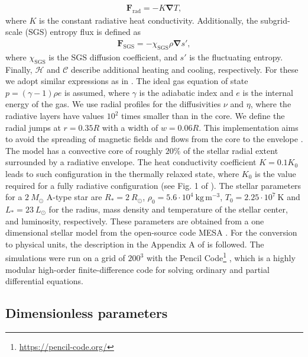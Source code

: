 \documentclass[baaa]{baaa}
\begin{document}
\begin{align}
    \bm{F}_\mathrm{rad} = - K \bm{\nabla} T, \label{radiative-flux}
\end{align}
where $K$ is the constant radiative heat conductivity. Additionally, the subgrid-scale (SGS) entropy flux is defined as
\begin{align}
    \bm{F}_\mathrm{SGS} = -\chi_\mathrm{SGS} \rho \bm{\nabla}s', \label{entropy-flux}
\end{align}
where $\chi_\mathrm{SGS}$ is the SGS diffusion coefficient, and $s'$ is the fluctuating entropy. Finally, $\mathcal{H}$ and $\mathcal{C}$ describe additional heating and cooling, respectively. For these we adopt similar expressions as in \cite{Kapyla-2021}. The ideal gas equation of state $p = (\gamma - 1)\rho e$ is assumed, where $\gamma$ is the adiabatic index and $e$ is the internal energy of the gas. We use radial profiles for the diffusivities $\nu$ and $\eta$, where the radiative layers have values $10^2$ times smaller than in the core. We define the radial jumps at $r=0.35R$ with a width of $w = 0.06R$. This implementation aims to avoid the spreading of magnetic fields and flows from the core to the envelope \citep[see][]{Kapyla-2022}.\\

The model has a convective core of roughly $20\%$ of the stellar radial extent surrounded by a radiative envelope. The heat conductivity coefficient $K = 0.1K_0$ leads to such configuration in the thermally relaxed state, where $K_0$ is the value required for a fully radiative configuration (see Fig. 1 of \citealt{Hidalgo-2023}). The stellar parameters for a $2~M_\odot$ A-type star are $R_* = 2 ~ R_\odot$, $\rho_0 = 5.6 \cdot 10^4~\mathrm{kg}\,\mathrm{m^{-3}}$, $T_0 = 2.25 \cdot 10^{7}~\mathrm{K}$ and $L_* = 23~ L_\odot$ for the radius, mass density and temperature of the stellar center, and luminosity, respectively. These parameters are obtained from a one dimensional stellar model from the open-source code MESA \citep{Paxton-2019}. For the conversion to physical units, the description in the Appendix A of \cite{Kapyla-2020} is followed. The simulations were run on a grid of $200^3$ with the {\sc Pencil Code}\footnote{\url{https://pencil-code.org/}} \citep{Pencil-code-2021}, which is a highly modular high-order finite-difference code for solving ordinary and partial differential equations. 

\subsection{Dimensionless parameters}
\end{document}
